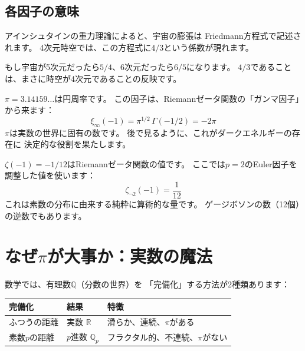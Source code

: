 \documentclass[12pt,a4paper]{article}
\begin{document}
\subsection{各因子の意味}

\begin{tcolorbox}[colback=gray!5!white, colframe=gray!50!black, title={因子1：重力 = $4/3$}]
アインシュタインの重力理論によると、宇宙の膨張は
Friedmann方程式で記述されます。
4次元時空では、この方程式に$4/3$という係数が現れます。

もし宇宙が5次元だったら$5/4$、6次元だったら$6/5$になります。
$4/3$であることは、まさに時空が4次元であることの反映です。
\end{tcolorbox}

\begin{tcolorbox}[colback=gray!5!white, colframe=gray!50!black, title={因子2：幾何学 = $2\pi$}]
$\pi = 3.14159\ldots$は円周率です。
この因子は、Riemannゼータ関数の「ガンマ因子」から来ます：
\[
  \xi_\infty(-1) = \pi^{1/2}\,\Gamma(-1/2) = -2\pi
\]
$\pi$は実数の世界に固有の数です。
後で見るように、これがダークエネルギーの存在に
決定的な役割を果たします。
\end{tcolorbox}

\begin{tcolorbox}[colback=gray!5!white, colframe=gray!50!black, title={因子3：算術 = $1/12$}]
$\zeta(-1) = -1/12$はRiemannゼータ関数の値です。
ここでは$p = 2$のEuler因子を調整した値を使います：
\[
  \zeta_{\neg 2}(-1) = \frac{1}{12}
\]
これは素数の分布に由来する純粋に算術的な量です。
ゲージボソンの数（12個）の逆数でもあります。
\end{tcolorbox}

\section{なぜ$\pi$が大事か：実数の魔法}

\begin{keyidea}
数学では、有理数$\mathbb{Q}$（分数の世界）を
「完備化」する方法が2種類あります：

\begin{center}
\begin{tabular}{lll}
\toprule
完備化 & 結果 & 特徴 \\
\midrule
ふつうの距離 & 実数 $\mathbb{R}$ & 滑らか、連続、$\pi$がある \\
素数$p$の距離 & $p$進数 $\mathbb{Q}_p$ & フラクタル的、不連続、$\pi$がない \\
\bottomrule
\end{tabular}
\end{center}
\end{keyidea}
\end{document}
